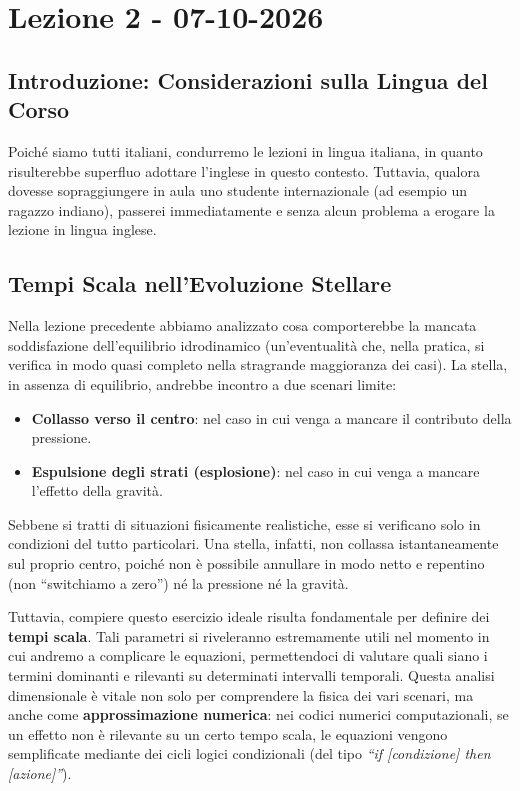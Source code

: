 \chapter{Lezione 2 - 07-10-2026}

\section{Introduzione: Considerazioni sulla Lingua del Corso}
Poiché siamo tutti italiani, condurremo le lezioni in lingua italiana, in quanto risulterebbe superfluo adottare l'inglese in questo contesto. Tuttavia, qualora dovesse sopraggiungere in aula uno studente internazionale (ad esempio un ragazzo indiano), passerei immediatamente e senza alcun problema a erogare la lezione in lingua inglese.

\section{Tempi Scala nell'Evoluzione Stellare}
Nella lezione precedente abbiamo analizzato cosa comporterebbe la mancata soddisfazione dell'equilibrio idrodinamico (un'eventualità che, nella pratica, si verifica in modo quasi completo nella stragrande maggioranza dei casi). La stella, in assenza di equilibrio, andrebbe incontro a due scenari limite:
\begin{itemize}
\item \textbf{Collasso verso il centro}: nel caso in cui venga a mancare il contributo della pressione.
\item \textbf{Espulsione degli strati (esplosione)}: nel caso in cui venga a mancare l'effetto della gravità.
\end{itemize}
Sebbene si tratti di situazioni fisicamente realistiche, esse si verificano solo in condizioni del tutto particolari. Una stella, infatti, non collassa istantaneamente sul proprio centro, poiché non è possibile annullare in modo netto e repentino (non ``switchiamo a zero'') né la pressione né la gravità.

Tuttavia, compiere questo esercizio ideale risulta fondamentale per definire dei \textbf{tempi scala}. Tali parametri si riveleranno estremamente utili nel momento in cui andremo a complicare le equazioni, permettendoci di valutare quali siano i termini dominanti e rilevanti su determinati intervalli temporali. Questa analisi dimensionale è vitale non solo per comprendere la fisica dei vari scenari, ma anche come \textbf{approssimazione numerica}: nei codici numerici computazionali, se un effetto non è rilevante su un certo tempo scala, le equazioni vengono semplificate mediante dei cicli logici condizionali (del tipo \textit{``if [condizione] then [azione]''}).

